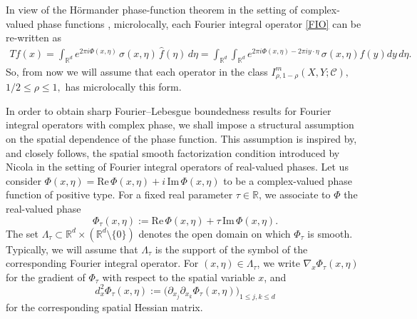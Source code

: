 \documentclass[12pt, reqno]{amsart}
\renewcommand{\Im}{\mathrm{Im}\,}
\renewcommand{\Re}{\mathrm{Re}\,}
\newtheorem{theorem}{Theorem}[section]
\theoremstyle{definition}
\theoremstyle{remark}
\numberwithin{equation}{section}
\begin{document}
In view of the H\"ormander phase-function theorem \cite{Hormander1971Ac} in the setting of complex-valued phase functions \cite{Melin-Sjostrand1976}, microlocally, each Fourier integral operator \eqref{FIO} can be re-written as 
\begin{align*}
Tf(x)=\int_{\mathbb{R}^d} e^{2\pi i \Phi(x,\eta)}\,\sigma(x,\eta)\,\widehat{f}(\eta)\,d\eta= \int_{\mathbb{R}^d}\int_{\mathbb{R}^d} e^{2\pi i \Phi(x,\eta)-2\pi i y\cdot \eta}\,\sigma(x,\eta)f(y)dy\,d\eta.
\end{align*} So, from now we will assume that each operator in the class  $I^m_{\rho,1-\rho}(X,Y;\mathcal{C}),$ $1/2\leq \rho\leq 1,$ has microlocally this form. 

In order to obtain sharp Fourier--Lebesgue boundedness results for Fourier integral operators with complex phase, we shall impose a structural assumption on the spatial dependence of the phase function. This assumption
is inspired by, and closely follows, the spatial smooth factorization
condition introduced by Nicola \cite{Nicola2010} in the setting of Fourier integral operators of real-valued phases.
Let us consider $\Phi(x,\eta)=\Re\Phi(x,\eta)+ i\,\Im\Phi(x,\eta)$ to be a
complex-valued phase function of positive type. For a fixed real parameter
$\tau\in\mathbb{R}$, we associate to $\Phi$ the real-valued phase
\[
\Phi_\tau(x,\eta):=\Re\Phi(x,\eta)+\tau\,\Im\Phi(x,\eta).
\]
The set $\Lambda_\tau\subset\mathbb{R}^d\times(\mathbb{R}^d\setminus\{0\})$
denotes the open domain on which $\Phi_\tau$ is smooth. Typically, we will assume that $\Lambda_\tau$ is the support of the symbol of the corresponding Fourier integral operator.
For $(x,\eta)\in\Lambda_\tau$, we write $\nabla_x\Phi_\tau(x,\eta)$ for the
gradient of $\Phi_\tau$ with respect to the spatial variable $x$, and
\[
d_x^2\Phi_\tau(x,\eta)
:=\bigl(\partial_{x_j}\partial_{x_k}\Phi_\tau(x,\eta)\bigr)_{1\le j,k\le d}
\]
for the corresponding spatial Hessian matrix.
\end{document}
